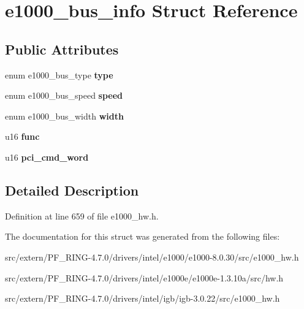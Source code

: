 \hypertarget{structe1000__bus__info}{
\section{e1000\_\-bus\_\-info Struct Reference}
\label{structe1000__bus__info}
}
\subsection*{Public Attributes}
\begin{DoxyCompactItemize}
\item 
\hypertarget{structe1000__bus__info_a729d4e45985e9118da83097adef0eb30}{
enum e1000\_\-bus\_\-type {\bfseries type}}
\label{structe1000__bus__info_a729d4e45985e9118da83097adef0eb30}

\item 
\hypertarget{structe1000__bus__info_a2f2a4e3414f897528020273da92ba417}{
enum e1000\_\-bus\_\-speed {\bfseries speed}}
\label{structe1000__bus__info_a2f2a4e3414f897528020273da92ba417}

\item 
\hypertarget{structe1000__bus__info_a8ab39042cadebe0c5fd8e3294ceefeb4}{
enum e1000\_\-bus\_\-width {\bfseries width}}
\label{structe1000__bus__info_a8ab39042cadebe0c5fd8e3294ceefeb4}

\item 
\hypertarget{structe1000__bus__info_ac7dfcdcfb9d9c5a7272764c1c8cd5716}{
u16 {\bfseries func}}
\label{structe1000__bus__info_ac7dfcdcfb9d9c5a7272764c1c8cd5716}

\item 
\hypertarget{structe1000__bus__info_a34538da830f8f0d98b4c0b6ea3552162}{
u16 {\bfseries pci\_\-cmd\_\-word}}
\label{structe1000__bus__info_a34538da830f8f0d98b4c0b6ea3552162}

\end{DoxyCompactItemize}


\subsection{Detailed Description}


Definition at line 659 of file e1000\_\-hw.h.



The documentation for this struct was generated from the following files:\begin{DoxyCompactItemize}
\item 
src/extern/PF\_\-RING-\/4.7.0/drivers/intel/e1000/e1000-\/8.0.30/src/e1000\_\-hw.h\item 
src/extern/PF\_\-RING-\/4.7.0/drivers/intel/e1000e/e1000e-\/1.3.10a/src/hw.h\item 
src/extern/PF\_\-RING-\/4.7.0/drivers/intel/igb/igb-\/3.0.22/src/e1000\_\-hw.h\end{DoxyCompactItemize}
